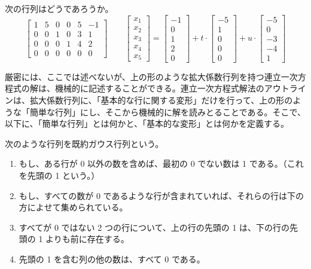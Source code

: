 次の行列はどうであろうか。
$$\left[\begin{array}{cccccc}
1 & 5 & 0 & 0 & 5 & -1\\
0 & 0 & 1 & 0 & 3 & 1\\
0 & 0 & 0 & 1 & 4 & 2\\
0 & 0 & 0 & 0 & 0 & 0
\end{array}\right] \qquad
\left[\begin{array}{c}
x_1\\x_2\\x_3\\x_4\\x_5
\end{array}\right] =
\left[\begin{array}{c}
-1\\0\\1\\2\\0
\end{array}\right] +  
t\cdot \left[\begin{array}{c}
-5\\1\\0\\0\\0
\end{array}\right] + 
u\cdot\left[\begin{array}{c}
-5\\0\\-3\\-4\\1
\end{array}\right]$$

厳密には、ここでは述べないが、上の形のような拡大係数行列を持つ連立一次方程式の解は、機械的に記述することができる。連立一次方程式解法のアウトラインは、拡大係数行列に、「基本的な行に関する変形」だけを行って、上の形のような「簡単な行列」にし、そこから機械的に解を読みとることである。そこで、以下に、「簡単な行列」とは何かと、「基本的な変形」とは何かを定義する。

\begin{definition}
次のような行列を{\gt 既約ガウス行列}という。
\begin{enumerate}
\item もし、ある行が 0 以外の数を含めば、最初の 0 でない数は 1 である。（これを先頭の 1 という。）
\item もし、すべての数が 0 であるような行が含まれていれば、それらの行は下の方によせて集められている。
\item すべてが 0 ではない 2 つの行について、上の行の先頭の 1 は、下の行の先頭の 1 よりも前に存在する。
\item 先頭の 1 を含む列の他の数は、すべて 0 である。
\end{enumerate}
\end{definition}

